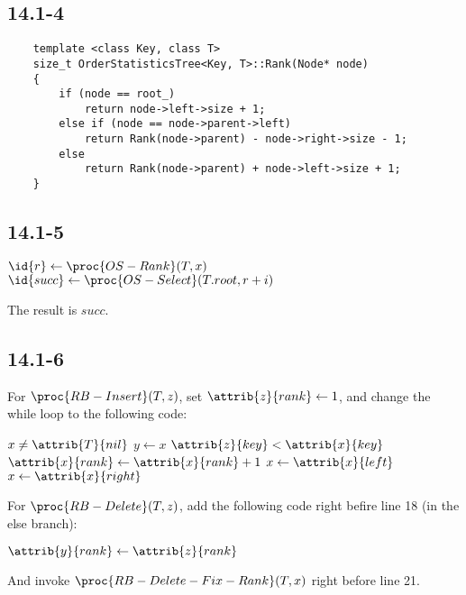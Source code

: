 \subsection*{14.1-4}

\begin{verbatim}
    template <class Key, class T>
    size_t OrderStatisticsTree<Key, T>::Rank(Node* node)
    {
        if (node == root_)
            return node->left->size + 1;
        else if (node == node->parent->left)
            return Rank(node->parent) - node->right->size - 1;
        else
            return Rank(node->parent) + node->left->size + 1;
    }
\end{verbatim}

\subsection*{14.1-5}

\begin{codebox}
    \li $\id{r} \gets \proc{OS-Rank}(T, x)$
    \li $\id{succ} \gets \proc{OS-Select}(T.root, r + i)$
\end{codebox}

The result is $succ$.

\subsection*{14.1-6}

\noindent
For $\proc{RB-Insert}(T, z)$,
set $\attrib{z}{rank} \gets 1$,
and change the while loop to the following code:

\begin{codebox}
    \li \While $x \neq \attrib{T}{nil}$
    \li \Do
            $y \gets x$
    \li     \If $\attrib{z}{key} < \attrib{x}{key}$
    \li     \Then
                $\attrib{x}{rank} \gets \attrib{x}{rank} + 1$
    \li         $x \gets \attrib{x}{left}$
    \li     \Else
                $x \gets \attrib{x}{right}$
            \End
        \End
\end{codebox}

\noindent
For $\proc{RB-Delete}(T, z)$,
add the following code right befire line 18 (in the else branch):

\begin{codebox}
    \zi $\attrib{y}{rank} \gets \attrib{z}{rank}$
\end{codebox}

\noindent
And invoke $\proc{RB-Delete-Fix-Rank}(T, x)$ right before line 21.

